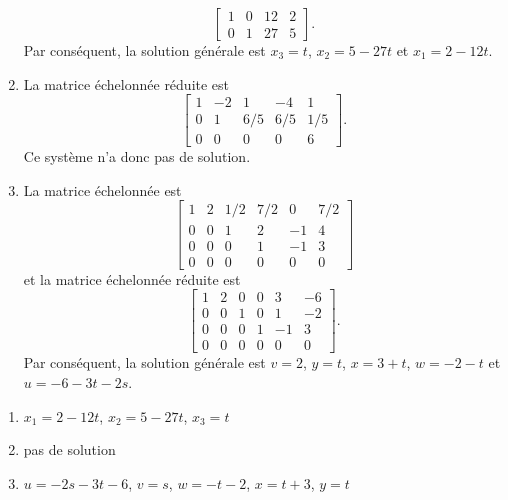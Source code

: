 \begin{exercice}
\begin{sol}
\begin{enumerate}
      \begin{displaymath}
        \begin{bmatrix}
          1 & 0 & 12 & 2 \\
          0 & 1 & 27 & 5
        \end{bmatrix}.
      \end{displaymath}
      Par conséquent, la solution générale est $x_3 = t$, $x_2 = 5 -
      27t$ et $x_1 = 2 - 12t$.
    \item La matrice échelonnée réduite est
      \begin{displaymath}
        \begin{bmatrix}
          1 & -2 &   1 &  -4 & 1 \\
          0 &  1 & 6/5 & 6/5 & 1/5 \\
          0 &  0 &   0 &   0 &   6
        \end{bmatrix}.
      \end{displaymath}
      Ce système n'a donc pas de solution.
    \item La matrice échelonnée est
      \begin{displaymath}
        \begin{bmatrix}
          1 & 2 & 1/2 & 7/2 &  0 & 7/2 \\
          0 & 0 &   1 &   2 & -1 &   4 \\
          0 & 0 &   0 &   1 & -1 &   3 \\
          0 & 0 &   0 &   0 &  0 &   0
        \end{bmatrix}
      \end{displaymath}
      et la matrice échelonnée réduite est
      \begin{displaymath}
        \begin{bmatrix}
          1 & 2 &   0 &   0 &  3 &  -6 \\
          0 & 0 &   1 &   0 &  1 &  -2 \\
          0 & 0 &   0 &   1 & -1 &   3 \\
          0 & 0 &   0 &   0 &  0 &   0
        \end{bmatrix}.
      \end{displaymath}
      Par conséquent, la solution générale est $v = 2$, $y = t$, $x =
      3 + t$, $w = -2 - t$ et $u = -6 - 3t - 2s$.
    \end{enumerate}
  \end{sol}
  \begin{rep}
    \begin{enumerate}
    \item $x_1 = 2 - 12t$, $x_2 = 5 - 27t$, $x_3 = t$
    \item pas de solution
    \item $u = -2s - 3t - 6$,
          $v = s$,
          $w = -t - 2$,
          $x = t + 3$,
          $y = t$
    \end{enumerate}
  \end{rep}
\end{exercice}

